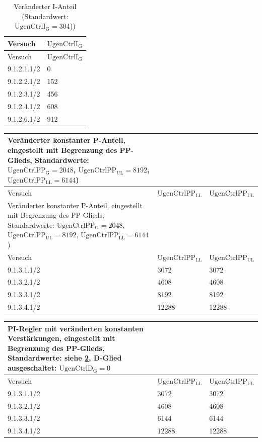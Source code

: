 \begin{longtable}[]{ll}
    \caption{Veränderter I-Anteil (Standardwert: $\mathrm{UgenCtrlI_G}=304$))}
    \label{tab:Parameter-I-Messung}
    \tabularnewline
    \toprule
    Versuch     & $\mathrm{UgenCtrlI_G}$ \\
    \midrule
    \endfirsthead
    \toprule
    Versuch     & $\mathrm{UgenCtrlI_G}$ \\
    \midrule
    \endhead    
        9.1.2.1.1/2 & 0            \\
        9.1.2.2.1/2 & 152          \\
        9.1.2.3.1/2 & 456          \\
        9.1.2.4.1/2 & 608          \\
        9.1.2.6.1/2 & 912          \\
    \bottomrule
\end{longtable}

\begin{longtable}[]{lll}
    \caption{Veränderter konstanter P-Anteil, eingestellt mit Begrenzung des PP-Glieds,\\Standardwerte: $\mathrm{UgenCtrlPP_G}=2048$, $\mathrm{UgenCtrlPP_{UL}}=8192$, $\mathrm{UgenCtrlPP_{LL}}=6144$)}
    \label{tab:Parameter-P-Messung}
        \tabularnewline
    \toprule
    Versuch     & $\mathrm{UgenCtrlPP_{LL}}$ & $\mathrm{UgenCtrlPP_{UL}}$ \\
    \midrule
    \endfirsthead
    \caption{Veränderter konstanter P-Anteil, eingestellt mit Begrenzung des PP-Glieds,\\Standardwerte: $\mathrm{UgenCtrlPP_G}=2048$, $\mathrm{UgenCtrlPP_{UL}}=8192$, $\mathrm{UgenCtrlPP_{LL}}=6144$)}
    \tabularnewline
    \toprule
    Versuch     & $\mathrm{UgenCtrlPP_{LL}}$ & $\mathrm{UgenCtrlPP_{UL}}$ \\
    \midrule
    \endhead
        9.1.3.1.1/2 & 3072         & 3072  \\
        9.1.3.2.1/2 & 4608         & 4608  \\
        9.1.3.3.1/2 & 8192         & 8192  \\
        9.1.3.4.1/2 & 12288        & 12288 \\
    \bottomrule
\end{longtable}

\begin{longtable}[]{lll}
    \caption{PI-Regler mit veränderten konstanten Verstärkungen, eingestellt mit Begrenzung des PP-Glieds,\\Standardwerte: siehe \cref{tab:Parameter-P-Messung},\\D-Glied ausgeschaltet: $\mathrm{UgenCtrlD_G=0}$}
    \label{tab:Parameter-PI-Messung}
    \tabularnewline
    \toprule
    Versuch     & $\mathrm{UgenCtrlPP_{LL}}$ & $\mathrm{UgenCtrlPP_{UL}}$ \\
    \midrule
    \endhead
        9.1.3.1.1/2 & 3072         & 3072  \\
        9.1.3.2.1/2 & 4608         & 4608  \\
        9.1.3.3.1/2 & 6144         & 6144  \\
        9.1.3.4.1/2 & 12288        & 12288 \\
    \bottomrule
\end{longtable}


